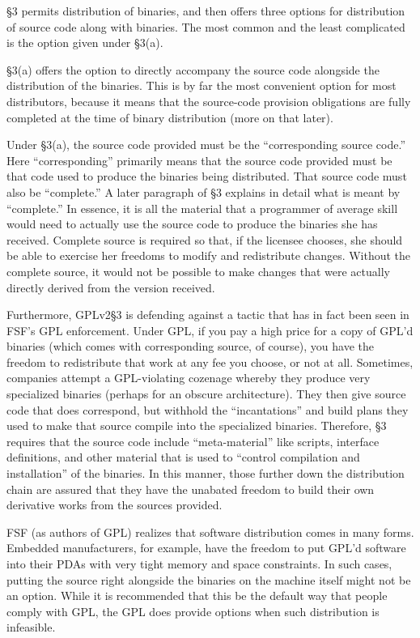 \S 3 permits distribution of binaries, and then offers three options for
distribution of source code along with binaries. The most common and the
least complicated is the option given under \S 3(a).

\S 3(a) offers the option to directly accompany the source code alongside
the distribution of the binaries. This is by far the most convenient
option for most distributors, because it means that the source-code
provision obligations are fully completed at the time of binary
distribution (more on that later).

Under \S 3(a), the source code provided must be the ``corresponding source
code.''  Here ``corresponding'' primarily means that the source code
provided must be that code used to produce the binaries being distributed.
That source code must also be ``complete.''  A later paragraph of \S 3
explains in detail what is meant by ``complete.''  In essence, it is all
the material that a programmer of average skill would need to actually use
the source code to produce the binaries she has received. Complete source
is required so that, if the licensee chooses, she should be able to
exercise her freedoms to modify and redistribute changes. Without the
complete source, it would not be possible to make changes that were
actually directly derived from the version received.

Furthermore, GPLv2\S 3 is defending against a tactic that has in fact been
seen in FSF's GPL enforcement. Under GPL, if you pay a high price for
a copy of GPL'd binaries (which comes with corresponding source, of
course), you have the freedom to redistribute that work at any fee you
choose, or not at all. Sometimes, companies attempt a GPL-violating
cozenage whereby they produce very specialized binaries (perhaps for
an obscure architecture). They then give source code that does
correspond, but withhold the ``incantations'' and build plans they
used to make that source compile into the specialized binaries.
Therefore, \S 3 requires that the source code include ``meta-material'' like
scripts, interface definitions, and other material that is used to
``control compilation and installation'' of the binaries. In this
manner, those further down the distribution chain are assured that
they have the unabated freedom to build their own derivative works
from the sources provided.

FSF (as authors of GPL) realizes that software distribution comes in many
forms. Embedded manufacturers, for example, have the freedom to put
GPL'd software into their PDAs with very tight memory and space
constraints. In such cases, putting the source right alongside the
binaries on the machine itself might not be an option. While it is
recommended that this be the default way that people comply with GPL, the
GPL does provide options when such distribution is infeasible.

